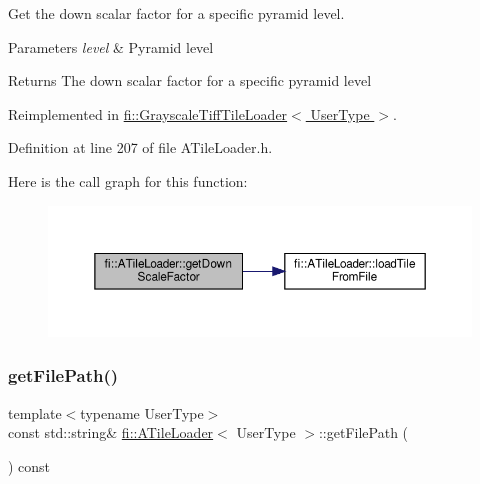 Get the down scalar factor for a specific pyramid level. 


\begin{DoxyParams}{Parameters}
{\em level} & Pyramid level \\
\hline
\end{DoxyParams}
\begin{DoxyReturn}{Returns}
The down scalar factor for a specific pyramid level 
\end{DoxyReturn}


Reimplemented in \hyperlink{classfi_1_1GrayscaleTiffTileLoader_a30200666aa71f80ea0fa9e035519635b}{fi\+::\+Grayscale\+Tiff\+Tile\+Loader$<$ User\+Type $>$}.



Definition at line 207 of file A\+Tile\+Loader.\+h.

Here is the call graph for this function\+:
\nopagebreak
\begin{figure}[H]
\begin{center}
\leavevmode
\includegraphics[width=350pt]{dc/d54/classfi_1_1ATileLoader_a07d565eeaa7076d905a329c80c1e980c_cgraph}
\end{center}
\end{figure}
\mbox{\label{classfi_1_1ATileLoader_a5efe3a55a89531b4ef657e58e5753340}} 
\subsubsection{\texorpdfstring{get\+File\+Path()}{getFilePath()}}
{\footnotesize\ttfamily template$<$typename User\+Type$>$ \\
const std\+::string\& \hyperlink{classfi_1_1ATileLoader}{fi\+::\+A\+Tile\+Loader}$<$ User\+Type $>$\+::get\+File\+Path (\begin{DoxyParamCaption}{ }\end{DoxyParamCaption}) const\hspace{0.3cm}{\ttfamily [inline]}}



